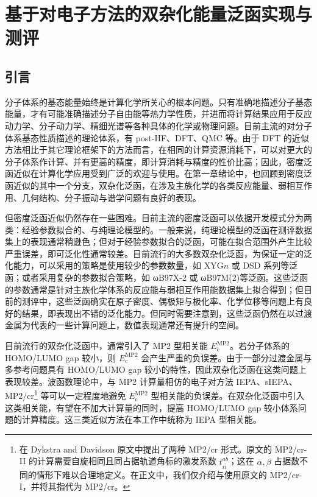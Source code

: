 
\chapter{基于对电子方法的双杂化能量泛函实现与测评}

\section{引言}

分子体系的基态能量始终是计算化学所关心的根本问题。只有准确地描述分子基态能量，才有可能准确描述分子自由能等热力学性质，并进而将计算结果应用于反应动力学、分子动力学、精细光谱等各种具体的化学或物理问题。目前主流的对分子体系基态性质描述的理论体系，有 post-HF、DFT、QMC 等。由于 DFT 的近似方法相比于其它理论框架下的方法而言，在相同的计算资源消耗下，可以对更大的分子体系作计算、并有更高的精度，即计算消耗与精度的性价比高；因此，密度泛函近似在计算化学应用受到广泛的欢迎与使用。在第一章绪论中，也回顾到密度泛函近似的其中一个分支，双杂化泛函，在涉及主族化学的各类反应能量、弱相互作用、几何结构、分子振动与谱学问题有良好的表现。

但密度泛函近似仍然存在一些困难。目前主流的密度泛函可以依据开发模式分为两类：经验参数拟合的、与纯理论模型的。一般来说，纯理论模型的泛函在测评数据集上的表现通常稍逊色\cite{Goerigk-Grimme.PCCP.2017}；但对于经验参数拟合的泛函，可能在拟合范围外产生比较严重误差，即可泛化性通常较差\cite{Medvedev-Lyssenko.S.2017}。目前流行的大多数双杂化泛函，为保证一定的泛化能力，可以采用的策略是使用较少的参数数量，如 XYG$n$\cite{Zhang-Xu.JPCL.2021} 或 DSD 系列\cite{Kozuch-Martin.JCC.2013}等泛函；或者采用复杂的参数拟合策略，如 ωB97X-2\cite{Chai-Head-Gordon.JCP.2009} 或 ωB97M(2)\cite{Mardirossian-Head-Gordon.JCP.2018}等泛函。这些泛函的参数通常是针对主族化学体系的反应能与弱相互作用能数据集上拟合得到；但目前的测评中，这些泛函确实在原子密度\cite{Su-Xu.PNAS.2018}、偶极矩与极化率\cite{Hait-Head-Gordon.JCTC.2018, Hait-Head-Gordon.PCCP.2018}、化学位移\cite{Stoychev-Neese.JCTC.2018}等问题上有良好的结果，即表现出不错的泛化能力。但同时需要注意到，这些泛函仍然在以过渡金属为代表的一些计算问题上，数值表现通常还有提升的空间。

目前流行的双杂化泛函中，通常引入了 MP2 型相关能 $E_\mathrm{c}^\mathrm{MP2}$。若分子体系的 HOMO/LUMO gap 较小，则 $E_\mathrm{c}^\mathrm{MP2}$ 会产生严重的负误差。由于一部分过渡金属与多参考问题具有 HOMO/LUMO gap 较小的特性，因此双杂化泛函在这类问题上表现较差。波函数理论中，与 MP2 计算量相仿的电子对方法 IEPA\cite{Sinanoǧlu-Sinanoǧlu.ACP.1964, Nesbet-Nesbet.ACP.1965}、sIEPA\cite{Zhang-Scheffler.PRL.2016}、MP2/cr\cite{Dykstra-Davidson.IJQC.2000}\footnote{在 Dykstra and Davidson 原文\cite{Dykstra-Davidson.IJQC.2000}中提出了两种 MP2/cr 形式。原文的 MP2/cr-II 的计算需要自旋相同且同占据轨道角标的激发系数 $t_{i \bar i}^{a \bar b}$；这在 $\alpha, \beta$ 占据数不同的情形下难以合理地定义。在正文中，我们仅介绍与使用原文的 MP2/cr-I，并将其指代为 MP2/cr。} 等可以一定程度地避免 $E_\mathrm{c}^\mathrm{MP2}$ 型相关能的负误差。在双杂化泛函中引入这类相关能，有望在不加大计算量的同时，提高 HOMO/LUMO gap 较小体系问题的计算精度。这三类近似方法在本工作中统称为 IEPA 型相关能。


